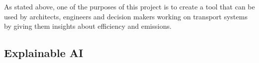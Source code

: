 
As stated above, %
one of the purposes of this project is to create a tool that can be used by architects, engineers and decision makers working on transport systems by giving them insights about efficiency and emissions.

\subsection{Explainable AI}
